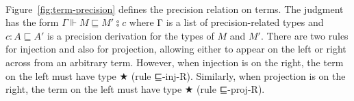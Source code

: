 \begin{code}[hide]
\AgdaSymbol{)}\<%
\\
%
\>[3]\AgdaSpace{}%
\AgdaSymbol{(}\AgdaSpace{}%
\AgdaSymbol{:}\AgdaSpace{}%
\AgdaSpace{}%
\AgdaSpace{}%
\AgdaSpace{}%
\AgdaSpace{}%
\AgdaSymbol{)}\<%
\\
%
\>[3]\AgdaSpace{}%
\AgdaSpace{}%
\AgdaSpace{}%
\<%
\\
\>[0]\AgdaSpace{}%
\AgdaSymbol{\{}\AgdaSpace{}%
\AgdaSymbol{\}}\AgdaSpace{}%
\AgdaSymbol{\{}\AgdaSpace{}%
\AgdaDottedPattern{\AgdaSymbol{)}}\AgdaSymbol{\}}\AgdaSpace{}%
\AgdaSpace{}%
\AgdaSpace{}%
\AgdaSymbol{=}\AgdaSpace{}%
\<%
\\
\>[0]\AgdaSpace{}%
\AgdaSymbol{\{}\AgdaSymbol{\}}\AgdaSpace{}%
\AgdaSymbol{\{}\AgdaSpace{}%
\AgdaSpace{}%
\AgdaDottedPattern{\AgdaSymbol{\AgdaUnderscore{})}}\AgdaSymbol{\}}\AgdaSpace{}%
\AgdaSymbol{(}\AgdaSpace{}%
\AgdaSpace{}%
\AgdaSymbol{)}\AgdaSpace{}%
\AgdaSymbol{(}\AgdaSpace{}%
\AgdaSpace{}%
\AgdaSymbol{)}\<%
\\
\>[0][@{}l@{\AgdaIndent{0}}]%
\>[4]\AgdaSpace{}%
\AgdaSpace{}%
\AgdaSpace{}%
\AgdaSpace{}%
\AgdaSymbol{|}\AgdaSpace{}%
\AgdaSpace{}%
\AgdaSpace{}%
\<%
\\
\>[0]\AgdaSpace{}%
\AgdaSymbol{|}\AgdaSpace{}%
\AgdaSpace{}%
\AgdaSymbol{|}\AgdaSpace{}%
\AgdaSpace{}%
\AgdaSymbol{=}\AgdaSpace{}%
\<%
\end{code}

Figure~\ref{fig:term-precision} defines the precision relation on
terms.  The judgment has the form $Γ ⊩ M ⊑ M′ ⦂ c$ where Γ is a list
of precision-related types and $c : A ⊑ A′$ is a precision derivation
for the types of $M$ and $M′$. There are two rules for injection and
also for projection, allowing either to appear on the left or right
across from an arbitrary term. However, when injection is on the
right, the term on the left must have type ★ (rule
\textsf{⊑-inj-R}).  Similarly, when projection is on the right, the
term on the left must have type ★ (rule \textsf{⊑-proj-R}).

